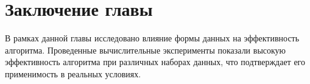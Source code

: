 \section{Заключение главы}
\label{MACR-SecConclusions}

В рамках данной главы исследовано влияние формы данных на эффективность алгоритма. Проведенные вычислительные эксперименты показали высокую эффективность алгоритма при различных наборах данных, что подтверждает его применимость в реальных условиях.
